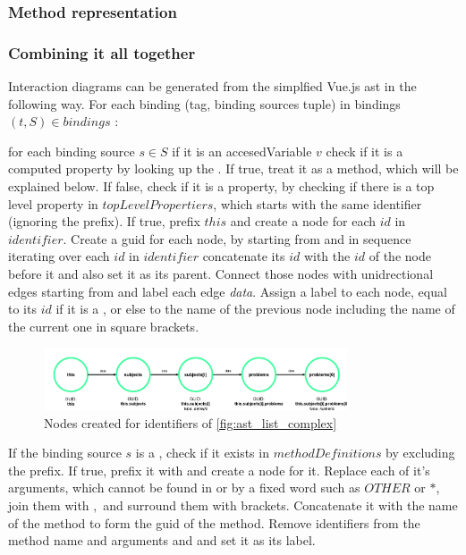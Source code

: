 \subsubsection{Method representation}

\subsubsection{Combining it all together}

Interaction diagrams can be generated from the simplfied Vue.js \gls{ast} in the following way.
For each binding (tag, binding sources tuple) in bindings $(t,S) \in bindings$ :

for each binding source $s \in S$
if it is an accesedVariable $v$
check if it is a computed property by looking up the . If true, treat it as a method, which will be explained below. If false, check if it is a property, by checking if there is a top level property in $topLevelPropertiers$, which starts with the same identifier (ignoring the  prefix).
If true, prefix $this$ and create a node for each $id$ in $identifier$. Create a \gls{guid} for each node, by starting from  and in sequence iterating over each $id$ in $identifier$ concatenate its $id$ with the $id$ of the node before it and also set it as its parent. Connect those nodes  with unidrectional edges starting from  and label each edge \textit{data}. Assign a label to each node, equal to its $id$ if it is a , or else to the name of the previous node including the name of the current one in square brackets. %
\begin{figure}[H]
    \includegraphics[width=0.8\textwidth]{images/graph_numeric_generic.png}
     \caption{Nodes created for identifiers of \ref{fig:ast_list_complex} }
     \label{fig:ast_list_complex_nodes}
\end{figure}

If the binding source $s$ is a , check if it exists in $methodDefinitions$ by excluding the  prefix. If true, prefix it with  and create a node for it. Replace each of it's arguments, which cannot be found in  or  by a fixed word such as $OTHER$ or $*$, join them with $,$ and surround them with brackets. Concatenate it with the name of the method to form the \gls{guid} of the method. Remove  identifiers from the method name and arguments and and set it as its label.

